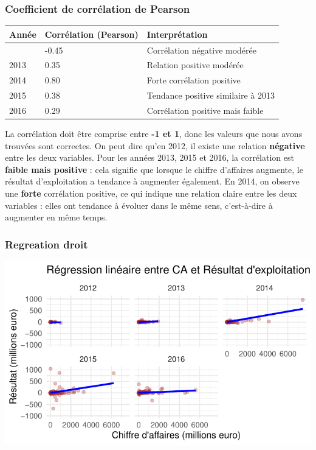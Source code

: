 \documentclass[mstat,12pt]{unswthesis}
\begin{document}
\subsubsection{Coefficient de corrélation de
Pearson}\label{coefficient-de-corruxe9lation-de-pearson}

\medskip

\begin{longtable}[]{@{}lll@{}}
\toprule\noalign{}
Année & Corrélation (Pearson) & Interprétation \\
\midrule\noalign{}
\endhead
\bottomrule\noalign{}
\endlastfoot
2012 & -0.45 & Corrélation négative modérée \\
2013 & 0.35 & Relation positive modérée \\
2014 & 0.80 & Forte corrélation positive \\
2015 & 0.38 & Tendance positive similaire à 2013 \\
2016 & 0.29 & Corrélation positive mais faible \\
\end{longtable}

\medskip

La corrélation doit être comprise entre \textbf{-1 et 1}, donc les
valeurs que nous avons trouvées sont correctes. On peut dire qu'en 2012,
il existe une relation \textbf{négative} entre les deux variables. Pour
les années 2013, 2015 et 2016, la corrélation est \textbf{faible mais
positive} : cela signifie que lorsque le chiffre d'affaires augmente, le
résultat d'exploitation a tendance à augmenter également. En 2014, on
observe une \textbf{forte} corrélation positive, ce qui indique une
relation claire entre les deux variables : elles ont tendance à évoluer
dans le même sens, c'est-à-dire à augmenter en même temps.

\newpage

\subsubsection{Regreation droit}\label{regreation-droit}

\includegraphics{scdon2-UPV-report-template_sansPython_files/figure-latex/reg_droit-1.pdf}
\end{document}

